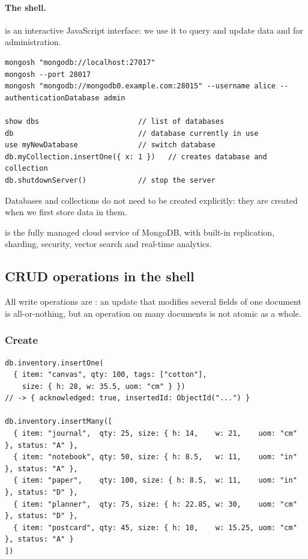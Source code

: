 \paragraph{The shell.}  is an interactive JavaScript interface: we use it to query and update data and for administration.
\begin{lstlisting}
mongosh "mongodb://localhost:27017"
mongosh --port 28017
mongosh "mongodb://mongodb0.example.com:28015" --username alice --authenticationDatabase admin

show dbs                       // list of databases
db                             // database currently in use
use myNewDatabase              // switch database
db.myCollection.insertOne({ x: 1 })   // creates database and collection
db.shutdownServer()            // stop the server
\end{lstlisting}
Databases and collections do not need to be created explicitly: they are created when we first store data in them.

 is the fully managed cloud service of MongoDB, with built-in replication, sharding, security, vector search and real-time analytics.

\subsection{CRUD operations in the shell}
All write operations are : an update that modifies several fields of one document is all-or-nothing, but an operation on many documents is not atomic as a whole.

\subsubsection{Create}
\begin{lstlisting}
db.inventory.insertOne(
  { item: "canvas", qty: 100, tags: ["cotton"],
    size: { h: 28, w: 35.5, uom: "cm" } })
// -> { acknowledged: true, insertedId: ObjectId("...") }

db.inventory.insertMany([
  { item: "journal",  qty: 25, size: { h: 14,    w: 21,    uom: "cm" }, status: "A" },
  { item: "notebook", qty: 50, size: { h: 8.5,   w: 11,    uom: "in" }, status: "A" },
  { item: "paper",    qty: 100, size: { h: 8.5,  w: 11,    uom: "in" }, status: "D" },
  { item: "planner",  qty: 75, size: { h: 22.85, w: 30,    uom: "cm" }, status: "D" },
  { item: "postcard", qty: 45, size: { h: 10,    w: 15.25, uom: "cm" }, status: "A" }
])
\end{lstlisting}

